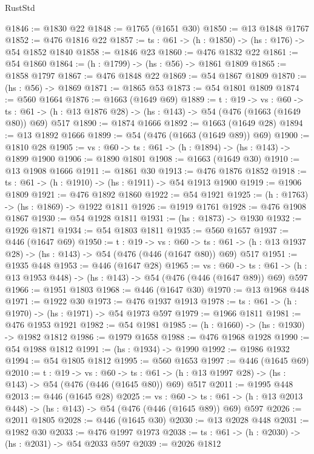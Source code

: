 \begin{lexlean}{RustStd}
\begin{coremodule}
{\begin{coremodule}
{{{{{{{@1846 := @1830 @22
@1848 := @1765 (@1651 @30)
@1850 := @13 @1848 @1767
@1852 := @476 @1816 @22
@1857 := {ts : @61} -> (h : @1850) -> (hs : @176) -> @54 @1852 @1840
@1858 := @1846 @23
@1860 := @476 @1832 @22
@1861 := @54 @1860
@1864 := (h : @1799) -> (hs : @56) -> @1861 @1809
@1865 := @1858 @1797
@1867 := @476 @1848 @22
@1869 := @54 @1867 @1809
@1870 := (hs : @56) -> @1869
@1871 := @1865 @53
@1873 := @54 @1801 @1809
@1874 := @560 @1664
@1876 := @1663 (@1649 @69)
@1889 := {t : @19} ->
  {vs : @60} ->
  {ts : @61} -> (h : @13 @1876 @28) -> (hs : @143) -> @54 (@476 (@1663 (@1649 @80)) @69) @517
@1890 := @1874 @1666
@1892 := @1663 (@1649 @28)
@1894 := @13 @1892 @1666
@1899 := @54 (@476 (@1663 (@1649 @89)) @69)
@1900 := @1810 @28
@1905 := {vs : @60} -> {ts : @61} -> (h : @1894) -> (hs : @143) -> @1899 @1900
@1906 := @1890 @1801
@1908 := @1663 (@1649 @30)
@1910 := @13 @1908 @1666
@1911 := @1861 @30
@1913 := @476 @1876 @1852
@1918 := {ts : @61} -> (h : @1910) -> (hs : @1911) -> @54 @1913 @1900
@1919 := @1906 @1809
@1921 := @476 @1892 @1860
@1922 := @54 @1921
@1925 := (h : @1763) -> (hs : @1869) -> @1922 @1811
@1926 := @1919 @1761
@1928 := @476 @1908 @1867
@1930 := @54 @1928 @1811
@1931 := (hs : @1873) -> @1930
@1932 := @1926 @1871
@1934 := @54 @1803 @1811
@1935 := @560 @1657
@1937 := @446 (@1647 @69)
@1950 := {t : @19} ->
  {vs : @60} ->
  {ts : @61} -> (h : @13 @1937 @28) -> (hs : @143) -> @54 (@476 (@446 (@1647 @80)) @69) @517
@1951 := @1935 @448
@1953 := @446 (@1647 @28)
@1965 := {vs : @60} ->
  {ts : @61} -> (h : @13 @1953 @448) -> (hs : @143) -> @54 (@476 (@446 (@1647 @89)) @69) @597
@1966 := @1951 @1803
@1968 := @446 (@1647 @30)
@1970 := @13 @1968 @448
@1971 := @1922 @30
@1973 := @476 @1937 @1913
@1978 := {ts : @61} -> (h : @1970) -> (hs : @1971) -> @54 @1973 @597
@1979 := @1966 @1811
@1981 := @476 @1953 @1921
@1982 := @54 @1981
@1985 := (h : @1660) -> (hs : @1930) -> @1982 @1812
@1986 := @1979 @1658
@1988 := @476 @1968 @1928
@1990 := @54 @1988 @1812
@1991 := (hs : @1934) -> @1990
@1992 := @1986 @1932
@1994 := @54 @1805 @1812
@1995 := @560 @1653
@1997 := @446 (@1645 @69)
@2010 := {t : @19} ->
  {vs : @60} ->
  {ts : @61} -> (h : @13 @1997 @28) -> (hs : @143) -> @54 (@476 (@446 (@1645 @80)) @69) @517
@2011 := @1995 @448
@2013 := @446 (@1645 @28)
@2025 := {vs : @60} ->
  {ts : @61} -> (h : @13 @2013 @448) -> (hs : @143) -> @54 (@476 (@446 (@1645 @89)) @69) @597
@2026 := @2011 @1805
@2028 := @446 (@1645 @30)
@2030 := @13 @2028 @448
@2031 := @1982 @30
@2033 := @476 @1997 @1973
@2038 := {ts : @61} -> (h : @2030) -> (hs : @2031) -> @54 @2033 @597
@2039 := @2026 @1812
}}}}}}}
\end{coremodule}}
\end{coremodule}
\end{lexlean}
